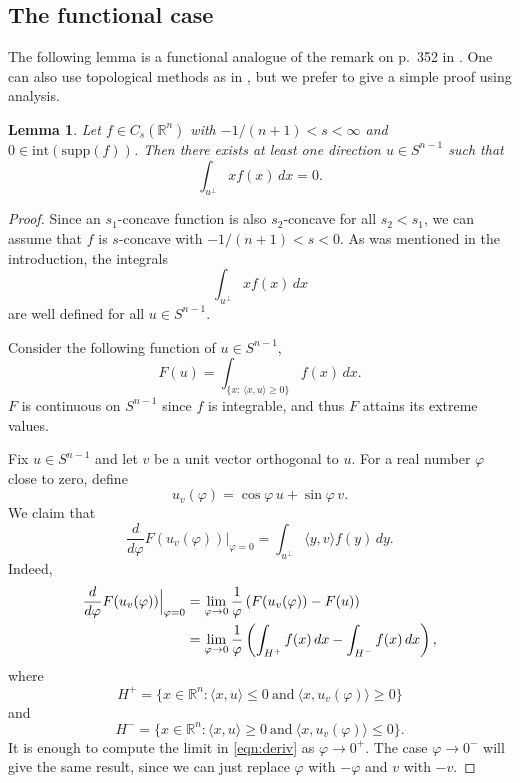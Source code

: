 \documentclass[12pt,letterpaper,reqno]{amsart}
\newtheorem{lemma}[theorem]{Lemma}
\theoremstyle{definition}
\begin{document}
			
			\subsection{The functional case}
			
			
			
			The following lemma is a functional analogue of the remark on p.~352 in \cite{MR}. One can also use topological methods as in  \cite[Lemma~8]{MR}, but we prefer to give a simple proof using analysis.
			\begin{lemma}\label{Lemma:MR}
				Let  $f\in C_s(\mathbb R^n)$ with $-1/(n+1)<s<\infty$  and $0 \in \text{int}\left(\text{supp}(f)\right)$. Then there exists at least one direction $u \in S^{n-1}$ such that 
				$$
				\int_{u^\perp} x f(x) \, dx = 0.
				$$
			\end{lemma}
			\begin{proof} Since an $s_1$-concave function is also $s_2$-concave for all $s_2<s_1$, we can assume that $f$ is   $s$-concave with $-1/(n+1)<s<0$.
				As was mentioned in the introduction, the integrals $$
				\int_{u^\perp} x f(x) \, dx 
				$$
				are well defined for all $u\in S^{n-1}$.
				
				Consider the following function of $u \in S^{n-1}$,
				$$
				F(u) = \int_{\{x: \, \langle x, u\rangle \geq 0\} } f(x) \, dx.
				$$
				$F$ is continuous on $S^{n-1}$ since $f$ is integrable, and thus $F$ attains its extreme values. 
				
			Fix $u\in S^{n-1}$ and  let $v$ be a unit vector orthogonal to $u$. For a real number  $\varphi$ close to zero, define $$u_v(\varphi) = \cos\varphi\, u +\sin \varphi\, v.$$ We claim that 
				\begin{equation}\label{formula:der}
					\frac{d}{d\varphi} F(u_v(\varphi)) \Big|_{\varphi=0} =  \int_{u^\perp} \langle y,v\rangle f(y) \, dy.
					\end{equation}
				Indeed,
				\begin{align}\label{eqn:deriv}\frac{d}{d\varphi} F(u_v(\varphi)) \Big|_{\varphi=0} &=\lim_{\varphi\to 0} \frac1{\varphi} \left(F(u_v(\varphi))- F(u)\right)		\notag	\\
					&=\lim_{\varphi\to 0} \frac1{\varphi} \left( \int_{H^+} f(x) \, dx - \int_{H^-} f(x) \, dx\right)	,		
					\end{align}
						where $$H^+ = \{ x\in \mathbb R^n: \langle  x , u\rangle \leq 0 \ \text{and}\ \langle  x , u_v(\varphi)\rangle \geq 0 \}$$ and $$H^- = \{ x\in \mathbb R^n: \langle  x , u\rangle \geq 0 \ \text{and}\ \langle  x , u_v(\varphi)\rangle \leq 0 \}.$$
						It is enough to compute the limit in \eqref{eqn:deriv} as $\varphi\to 0^+$.  The case $\varphi\to 0^-$ will give the same result, since we can just replace $\varphi$ with $-\varphi$ and $v$ with $-v$.
						

\end{proof}
\end{document}

